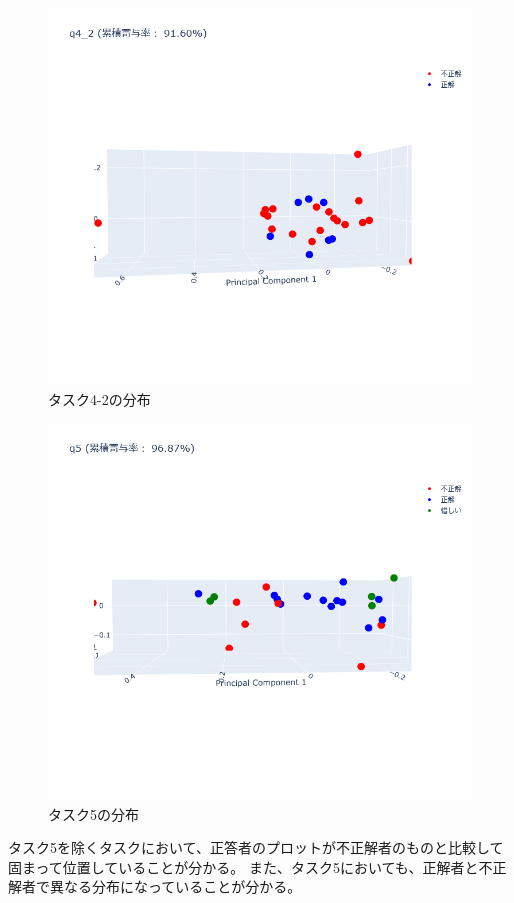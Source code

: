 \documentclass[paper=a4paper,fontsize=11pt]{jlreq}
\begin{document}
    \FloatBarrier
    \begin{figure}[htbp]
      \centering
      \includegraphics[width=0.8\linewidth]{3dplot_q4_2.png}
      \caption{タスク4-2の分布}
      \label{3dplot_q4_2}
    \end{figure}
    \FloatBarrier
    \begin{figure}[htbp]
      \centering
      \includegraphics[width=0.8\linewidth]{3dplot_q5.png}
      \caption{タスク5の分布}
      \label{3dplot_q5}
    \end{figure}
    \FloatBarrier

    タスク5を除くタスクにおいて、正答者のプロットが不正解者のものと比較して固まって位置していることが分かる。
    また、タスク5においても、正解者と不正解者で異なる分布になっていることが分かる。
\end{document}

